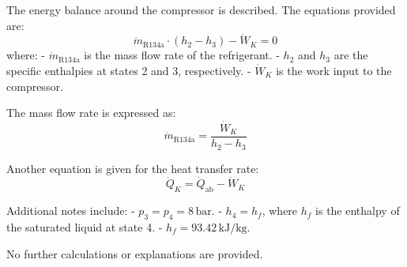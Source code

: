 The energy balance around the compressor is described. The equations provided are:  
\[
\dot{m}_{\text{R134a}} \cdot (h_2 - h_3) - \dot{W}_K = 0
\]
where:  
- \( \dot{m}_{\text{R134a}} \) is the mass flow rate of the refrigerant.  
- \( h_2 \) and \( h_3 \) are the specific enthalpies at states 2 and 3, respectively.  
- \( \dot{W}_K \) is the work input to the compressor.  

The mass flow rate is expressed as:  
\[
\dot{m}_{\text{R134a}} = \frac{\dot{W}_K}{h_2 - h_3}
\]

Another equation is given for the heat transfer rate:  
\[
\dot{Q}_K = \dot{Q}_{\text{ab}} - \dot{W}_K
\]

Additional notes include:  
- \( p_3 = p_4 = 8 \, \text{bar} \).  
- \( h_4 = h_f \), where \( h_f \) is the enthalpy of the saturated liquid at state 4.  
- \( h_f = 93.42 \, \text{kJ/kg} \).  

No further calculations or explanations are provided.